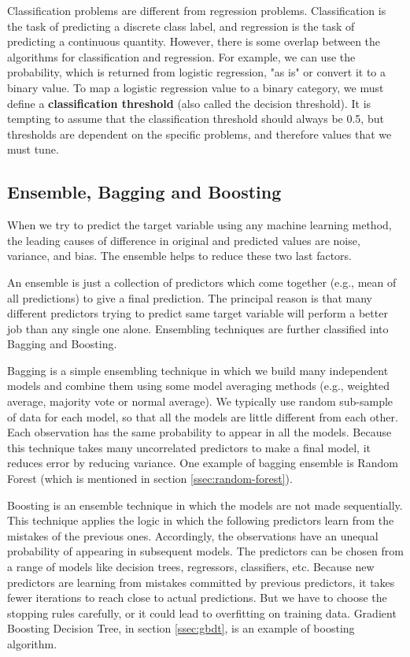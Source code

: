 Classification problems are different from regression problems. Classification is the task of predicting a discrete class label, and regression is the task of predicting a continuous quantity. However, there is some overlap between the algorithms for classification and regression.
For example, we can use the probability, which is returned from logistic regression, "as is" or convert it to a binary value. To map a logistic regression value to a binary category, we must define a \textbf{classification threshold} (also called the decision threshold). It is tempting to assume that the classification threshold should always be 0.5, but thresholds are dependent on the specific problems, and therefore values that we must tune.

\subsection{Ensemble, Bagging and Boosting}

When we try to predict the target variable using any machine learning method, the leading causes of difference in original and predicted values are noise, variance, and bias. The ensemble helps to reduce these two last factors.

An ensemble is just a collection of predictors which come together (e.g., mean of all predictions) to give a final prediction. The principal reason is that many different predictors trying to predict same target variable will perform a better job than any single one alone. Ensembling techniques are further classified into Bagging and Boosting.

Bagging is a simple ensembling technique in which we build many independent models and combine them using some model averaging methods (e.g., weighted average, majority vote or normal average). We typically use random sub-sample of data for each model, so that all the models are little different from each other. Each observation has the same probability to appear in all the models. Because this technique takes many uncorrelated predictors to make a final model, it reduces error by reducing variance. One example of bagging ensemble is Random Forest (which is mentioned in section \ref{ssec:random-forest}).

Boosting is an ensemble technique in which the models are not made sequentially. This technique applies the logic in which the following predictors learn from the mistakes of the previous ones. Accordingly, the observations have an unequal probability of appearing in subsequent models. The predictors can be chosen from a range of models like decision trees, regressors, classifiers, etc. Because new predictors are learning from mistakes committed by previous predictors, it takes fewer iterations to reach close to actual predictions. But we have to choose the stopping rules carefully, or it could lead to overfitting on training data. Gradient Boosting Decision Tree, in section \ref{ssec:gbdt}, is an example of boosting algorithm.

